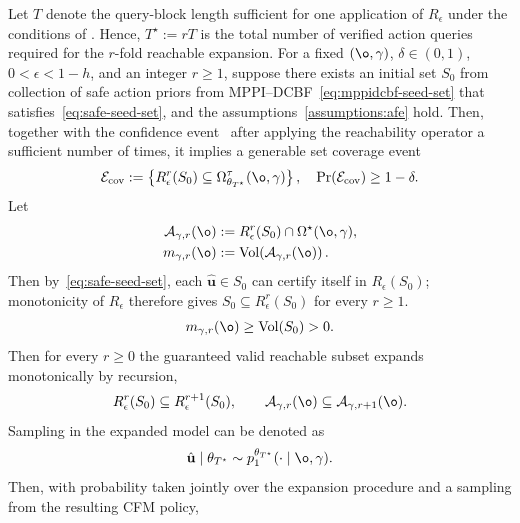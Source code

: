 \begin{corollary}
\label{thm:safe-action-availability}
Let $T$ denote the query-block length sufficient for one application
of $R_\epsilon$ under the conditions of
\cite[Thm.~F.5]{de2026active}. Hence,
$T^\star:=rT$ is the total number of verified action queries required
for the $r$-fold reachable expansion. For a fixed $(\o,\gamma)$, $\delta\in(0,1)$,
$0<\epsilon<1-h$, and an integer $r\ge1$, suppose there exists an initial set $S_0$ from collection of safe action priors from MPPI--DCBF~\eqref{eq:mppidcbf-seed-set} that satisfies~\eqref{eq:safe-seed-set}, and the assumptions~\ref{assumptions:afe} hold. Then, together with the confidence event~\cite[Thm.~2]{pasztor2024bandits} after applying the reachability operator a sufficient number of times, it implies a generable set coverage event
\begin{equation}
\mathcal E_{\mathrm{cov}}
:=
\left\{
R_\epsilon^r(S_0)
\subseteq
\Omega_{\theta_{T^\star}}^\tau(\o,\gamma)
\right\},
\quad
\Pr(\mathcal E_{\mathrm{cov}})\ge1-\delta.
\label{eq:coverage-event}
\end{equation}
\noindent Let
\begin{equation}
\begin{aligned}
\mathcal A_{\gamma,r}(\o)
&:=
R_\epsilon^r(S_0)
\cap
\Omega^\star(\o,\gamma),\\
m_{\gamma,r}(\o)
&:=
\operatorname{Vol}
\!\left(
\mathcal A_{\gamma,r}(\o)
\right).
\end{aligned}
\label{eq:safe-reachable-region}
\end{equation}
Then by~\eqref{eq:safe-seed-set}, each
$\hat{\mathbf u}\in S_0$ can certify itself in
$R_\epsilon(S_0)$; monotonicity of $R_\epsilon$ therefore gives
$S_0\subseteq R_\epsilon^r(S_0)$ for every $r\ge1$.
\begin{equation}
m_{\gamma,r}(\o)
\ge
\operatorname{Vol}(S_0)>0.
\label{eq:positive-safe-reachable-volume}
\end{equation}
Then for every $r\ge0$ the guaranteed valid reachable subset expands monotonically by recursion,
\begin{equation}
\label{eq:monotonicity}
R_\epsilon^r(S_0)
\subseteq
R_\epsilon^{r+1}(S_0),
\qquad
\mathcal A_{\gamma,r}(\o)
\subseteq
\mathcal A_{\gamma,r+1}(\o).
\end{equation}
Sampling in the expanded model can be denoted as
\[
\hat{\mathbf u}
\mid\theta_{T^\star}
\sim
p_1^{\theta_{T^\star}}(\cdot\mid\o,\gamma).
\]
Then, with probability taken jointly over the expansion procedure and a sampling from the resulting CFM policy,

\end{corollary}
